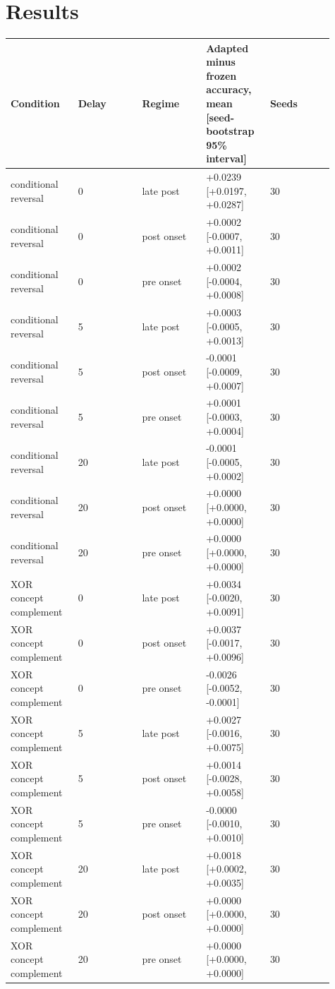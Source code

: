 \documentclass[11pt,a4paper]{article}
\begin{document}
\section{Results}

\begingroup\scriptsize
\begin{longtable}{p{0.182\linewidth}p{0.182\linewidth}p{0.182\linewidth}p{0.182\linewidth}p{0.182\linewidth}}
\toprule
Condition & Delay & Regime & Adapted minus frozen accuracy, mean [seed-bootstrap 95\% interval] & Seeds \\
\midrule
conditional reversal & 0 & late post & +0.0239 [+0.0197, +0.0287] & 30 \\
conditional reversal & 0 & post onset & +0.0002 [-0.0007, +0.0011] & 30 \\
conditional reversal & 0 & pre onset & +0.0002 [-0.0004, +0.0008] & 30 \\
conditional reversal & 5 & late post & +0.0003 [-0.0005, +0.0013] & 30 \\
conditional reversal & 5 & post onset & -0.0001 [-0.0009, +0.0007] & 30 \\
conditional reversal & 5 & pre onset & +0.0001 [-0.0003, +0.0004] & 30 \\
conditional reversal & 20 & late post & -0.0001 [-0.0005, +0.0002] & 30 \\
conditional reversal & 20 & post onset & +0.0000 [+0.0000, +0.0000] & 30 \\
conditional reversal & 20 & pre onset & +0.0000 [+0.0000, +0.0000] & 30 \\
XOR concept complement & 0 & late post & +0.0034 [-0.0020, +0.0091] & 30 \\
XOR concept complement & 0 & post onset & +0.0037 [-0.0017, +0.0096] & 30 \\
XOR concept complement & 0 & pre onset & -0.0026 [-0.0052, -0.0001] & 30 \\
XOR concept complement & 5 & late post & +0.0027 [-0.0016, +0.0075] & 30 \\
XOR concept complement & 5 & post onset & +0.0014 [-0.0028, +0.0058] & 30 \\
XOR concept complement & 5 & pre onset & -0.0000 [-0.0010, +0.0010] & 30 \\
XOR concept complement & 20 & late post & +0.0018 [+0.0002, +0.0035] & 30 \\
XOR concept complement & 20 & post onset & +0.0000 [+0.0000, +0.0000] & 30 \\
XOR concept complement & 20 & pre onset & +0.0000 [+0.0000, +0.0000] & 30 \\
\bottomrule
\end{longtable}
\endgroup
\end{document}
